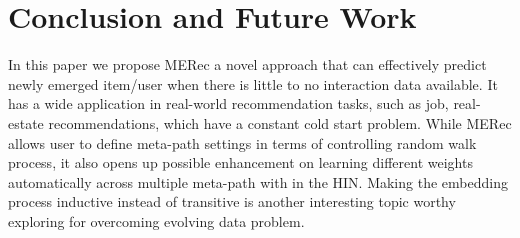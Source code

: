 \section{Conclusion and Future Work}
In this paper we propose MERec a novel approach that can effectively predict newly emerged item/user when there is little to no interaction data available. It has a wide application in real-world recommendation tasks, such as job, real-estate recommendations, which have a constant cold start problem. 
While MERec allows user to define meta-path settings in terms of controlling random walk process, it also opens up possible enhancement on learning different weights automatically across multiple meta-path with in the HIN. Making the embedding process inductive instead of transitive is another interesting topic worthy exploring for overcoming evolving data problem.